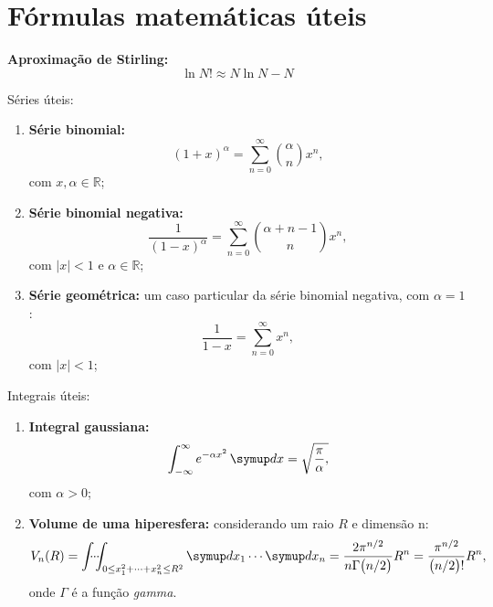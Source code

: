 \chapter{Fórmulas matemáticas úteis}

\textbf{Aproximação de Stirling:}
\begin{equation}\label{eq_appx:approximacao_de_stirling}
    \ln N! \approx N\ln N-N
\end{equation}

Séries úteis:
\begin{enumerate}
    \item \textbf{Série binomial:}
    \begin{equation}\label{eq_appx:serie_binomial}
        (1+x)^{\alpha}=\sum_{n=0}^{\infty}\binom{\alpha}{n}x^n,
    \end{equation}
    com $x,\alpha\in\mathbb{R}$;
    \item \textbf{Série binomial negativa:}
    \begin{equation}\label{eq_appx:serie_binomial_negativa}
    \frac{1}{(1-x)^{\alpha}}=\sum_{n=0}^{\infty}\binom{\alpha+n-1}{n}x^n,
    \end{equation}
    com $|x|<1$ e $\alpha\in\mathbb{R}$;
    \item \textbf{Série geométrica:} um caso particular da série binomial negativa, com $\alpha=1$:
    \begin{equation}\label{eq_appx:serie_geometrica}
        \frac{1}{1-x}=\sum_{n=0}^{\infty}x^n,
    \end{equation}
    com $|x|<1$;
\end{enumerate}

Integrais úteis:
\begin{enumerate}
    \item \textbf{Integral gaussiana:}
    \begin{equation}\label{eq_appx:integral_gaussiana}
        \int_{-\infty}^{\infty}e^{-\alpha x^2}\diff x = \sqrt{\frac{\pi}{\alpha},}
    \end{equation}
    com $\alpha>0$;
    \item \textbf{Volume de uma hiperesfera:} considerando um raio $R$ e dimensão n:
    \begin{equation}\label{eq_appx:volume_hiperesfera}
        V_n(R) = \idotsint_{0\leq x_1^2+\cdots+x_n^2\leq R^2}\diff x_1\cdots\diff x_n=\frac{2\pi^{n/2}}{n\Gamma\big(n/2\big)}R^n=\frac{\pi^{n/2}}{\big(n/2\big)!}R^n,
    \end{equation}
    onde $\Gamma$ é a função \textit{gamma}.
\end{enumerate}